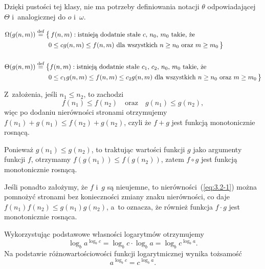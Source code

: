 Dzięki pustości tej klasy, nie ma potrzeby definiowania notacji $\theta$ odpowiadającej $\Theta$ i~analogicznej do $o$ i~$\omega$.

\exercise %
\[
	\begin{split}
		\Omega(g(n,m)) &\stackrel{\text{\scriptsize def}}{=} \bigl\{\,f(n,m):\text{istnieją dodatnie stałe $c$,~$n_0$,~$m_0$ takie, że} \\
		&\qquad 0 \le cg(n,m) \le f(n,m) \text{ dla wszystkich $n \ge n_0$ oraz $m \ge m_0$}\,\bigr\} \\[5mm]
		\Theta(g(n,m)) &\stackrel{\text{\scriptsize def}}{=} \bigl\{f(n,m):\text{istnieją dodatnie stałe $c_1$,~$c_2$,~$n_0$,~$m_0$ takie, że} \\
		&\qquad 0 \le c_1g(n,m) \le f(n,m) \le c_2g(n,m) \text{ dla wszystkich $n \ge n_0$ oraz $m \ge m_0$}\,\bigr\}
	\end{split}
\]


\exercise %
Z~założenia, jeśli $n_1\le n_2$, to zachodzi
\begin{equation}
	f(n_1) \le f(n_2) \quad\text{oraz}\quad g(n_1) \le g(n_2), \label{eq:3.2-1}
\end{equation}
więc po dodaniu nierówności stronami otrzymujemy $f(n_1)+g(n_1)\le f(n_2)+g(n_2)$, czyli że $f+g$ jest funkcją monotonicznie rosnącą.

Ponieważ $g(n_1)\le g(n_2)$, to traktując wartości funkcji $g$ jako argumenty funkcji $f$, otrzymamy $f(g(n_1))\le f(g(n_2))$, zatem $f\circ g$ jest funkcją monotonicznie rosnącą.

Jeśli ponadto założymy, że $f$ i~$g$ są nieujemne, to nierówności~(\ref{eq:3.2-1}) można pomnożyć stronami bez konieczności zmiany znaku nierówności, co daje $f(n_1)f(n_2)\le g(n_1)g(n_2)$, a~to oznacza, że również funkcja $f\cdot g$ jest monotonicznie rosnąca.

\exercise %
Wykorzystując podstawowe własności logarytmów otrzymujemy
\[
	\log_ba^{\log_bc} = \log_bc\cdot\log_ba = \log_bc^{\log_ba}.
\]
Na podstawie różnowartościowości funkcji logarytmicznej wynika tożsamość
\[
	a^{\log_bc} = c^{\log_ba}.
\]

